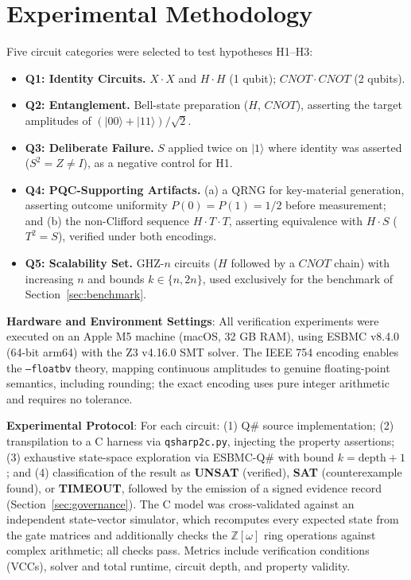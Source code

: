 \documentclass[journal]{IEEEtran} %
\begin{document}
\section{Experimental Methodology}
Five circuit categories were selected to test hypotheses H1--H3:
\begin{itemize}
    \item \textbf{Q1: Identity Circuits.} $X \cdot X$ and $H \cdot H$ (1 qubit); $CNOT \cdot CNOT$ (2 qubits).
    \item \textbf{Q2: Entanglement.} Bell-state preparation ($H$, $CNOT$), asserting the target amplitudes of $(|00\rangle + |11\rangle)/\sqrt{2}$.
    \item \textbf{Q3: Deliberate Failure.} $S$ applied twice on $|1\rangle$ where identity was asserted ($S^2 = Z \neq I$), as a negative control for H1.
    \item \textbf{Q4: PQC-Supporting Artifacts.} (a) a QRNG for key-material generation, asserting outcome uniformity $P(0) = P(1) = 1/2$ before measurement; and (b) the non-Clifford sequence $H \cdot T \cdot T$, asserting equivalence with $H \cdot S$ ($T^2 = S$), verified under both encodings.
    \item \textbf{Q5: Scalability Set.} GHZ-$n$ circuits ($H$ followed by a $CNOT$ chain) with increasing $n$ and bounds $k \in \{n, 2n\}$, used exclusively for the benchmark of Section~\ref{sec:benchmark}.
\end{itemize}

\textbf{Hardware and Environment Settings}: All verification experiments were executed on an Apple M5 machine (macOS, 32 GB RAM), using ESBMC v8.4.0 (64-bit arm64) with the Z3 v4.16.0 SMT solver. The IEEE 754 encoding enables the \texttt{--floatbv} theory, mapping continuous amplitudes to genuine floating-point semantics, including rounding; the exact encoding uses pure integer arithmetic and requires no tolerance.

\textbf{Experimental Protocol}: For each circuit: (1) Q\# source implementation; (2) transpilation to a C harness via \texttt{qsharp2c.py}, injecting the property assertions; (3) exhaustive state-space exploration via ESBMC-Q\# with bound $k = \text{depth} + 1$; and (4) classification of the result as \textbf{UNSAT} (verified), \textbf{SAT} (counterexample found), or \textbf{TIMEOUT}, followed by the emission of a signed evidence record (Section~\ref{sec:governance}). The C model was cross-validated against an independent state-vector simulator, which recomputes every expected state from the gate matrices and additionally checks the $\mathbb{Z}[\omega]$ ring operations against complex arithmetic; all checks pass. Metrics include verification conditions (VCCs), solver and total runtime, circuit depth, and property validity.
\end{document}

